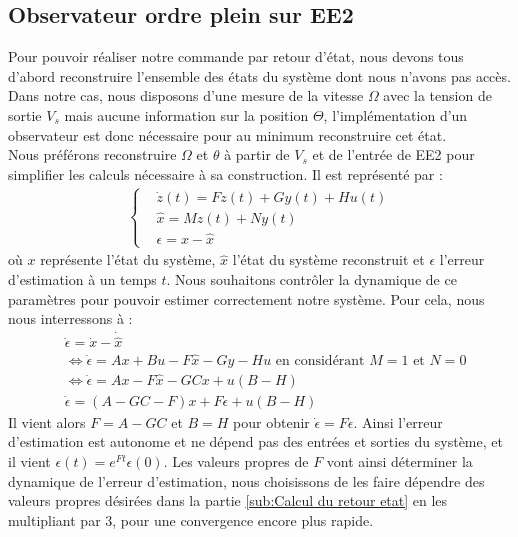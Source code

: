 \subsection{Observateur ordre plein sur EE2}
Pour pouvoir réaliser notre commande par retour d'état, nous devons tous d'abord reconstruire l'ensemble des états du système dont nous n'avons pas accès. Dans notre cas, nous disposons d'une mesure de la vitesse $\Omega$ avec la tension de sortie $V_s$ mais aucune information sur la position $\Theta$, l'implémentation d'un observateur est donc nécessaire pour au minimum reconstruire cet état.\\
Nous préférons reconstruire $\Omega$ et $\theta$ à partir de $V_s$ et de l'entrée de EE2 pour simplifier les calculs nécessaire à sa construction. Il est représenté par :
\begin{align*}
\left\lbrace
\begin{aligned}
&\dot z (t) = Fz(t) + Gy(t) + Hu(t)\\
&\hat x = Mz(t) + Ny(t)\\
&\epsilon = x-\hat{x}
\end{aligned}
\right.
\end{align*} où $x$ représente l'état du système, $\hat{x}$ l'état du système reconstruit et $\epsilon$ l'erreur d'estimation à un temps $t$. Nous souhaitons contrôler la dynamique de ce paramètres pour pouvoir estimer correctement notre système. Pour cela, nous nous interressons à : \begin{align*}
&\dot{\epsilon} = \dot{x} - \dot{\hat{x}}\\
&\Leftrightarrow \dot{\epsilon} = Ax +Bu - F\hat{x} - Gy - Hu 
\text{   en considérant }M=1 \text{ et } N = 0\\
& \Leftrightarrow \dot{\epsilon} = Ax - F\hat{x} - GCx + u(B-H)\\
& \dot{\epsilon} = (A-GC-F)x + F\epsilon + u(B-H)
\end{align*} 
Il vient alors $F = A-GC$ et $B=H$ pour obtenir $\dot{\epsilon} = F\epsilon$. Ainsi l'erreur d'estimation est autonome et ne dépend pas des entrées et sorties du système, et il vient $\epsilon(t) = e^{Ft}\epsilon(0)$. Les valeurs propres de $F$ vont ainsi déterminer la dynamique de l'erreur d'estimation, nous choisissons de les faire dépendre des valeurs propres désirées dans la partie \ref{sub:Calcul du retour etat} en les multipliant par 3, pour une convergence encore plus rapide. 

